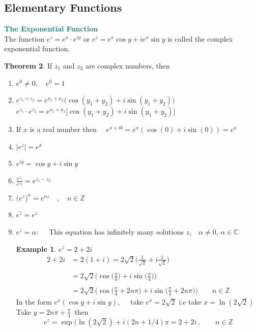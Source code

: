 \documentclass[11pt,a4paper]{article}
\theoremstyle{definition}
\newtheorem{thm}{Theorem}[section]
\newtheorem{example}[thm]{Example}
\begin{document}
{\color[wave]{485}\subsection{Elementary Functions}}

\textbf{\textcolor{teal}{The Exponential Function}}\\
The function $\boxed{e^z = e^x\cdot e^{iy}}$ or $\boxed{e^z = e^x\cos y + ie^x\sin y}$ is called the complex exponential function.\\


\begin{thm}
If $z_1$ and $z_2$ are complex numbers, then

\begin{enumerate}
\item $e^0 \neq 0, \quad e^0 = 1$

\item $e^{z_1 + z_2} = e^{x_1+x_2}\big(\cos (y_1 + y_2) + i\sin (y_1+ y_2)\big)$\\

$e^{z_1}\cdot e^{z_2} = e^{x_1 + x_2} \big[\cos (y_1 + y_2) + i\sin (y_1 + y_2)\big]$

\item If $x$ is a real number then $\quad e^{x + i0} = e^x (\cos(0) + i\sin (0)) = e^x$

\item $\left|e^z\right| = e^x$

\item $e^{iy} = \cos y + i\sin y$

\item $\frac{e^{z_1}}{e^{z_2}} = e^{z_1 -z_2}$

\item $\Big(e^z\Big)^n = e^{nz}\quad , \quad  n \in \mathbb{Z}$

\item $\overline{e^z} = e^{\overline{z}}$

\item $e^z = \alpha:\quad $ This equation has infinitely many solutions $z$,$\quad  \alpha \neq 0,\,\alpha \in \mathbb{C}$\\

\begin{example}
$e^z= 2  + 2i$
\begin{align*}
2 + 2i & = 2(1 + i) = 2\sqrt{2}\Big(\frac{1}{\sqrt{2}} + i \frac{1}{\sqrt{2}}\Big)\\\\
& = 2\sqrt{2}\Big(\cos \Big(\frac{\pi}{4}\Big) + i \sin \Big(\frac{\pi}{4}\Big)\Big)\\\\
& =  2\sqrt{2}\Big(\cos \Big(\frac{\pi}{4} + 2n\pi\Big) + i \sin \Big(\frac{\pi}{4} + 2n\pi\Big)\Big)\qquad n\in \mathbb{Z}
\end{align*}
In the form $e^x(\cos y + i\sin y),\quad $ take $e^x = 2\sqrt{2}$ i.e take $x = \ln (2\sqrt{2})$\\
Take $y = 2n\pi + \frac{\pi}{4}\,$ then 
$$e^z = \exp(\ln (2\sqrt{2}) + i (2n + 1/4)\pi = 2 + 2i \,, \qquad  n\in \mathbb{Z}$$
\end{example}



\end{enumerate}
\end{thm}
\end{document}
